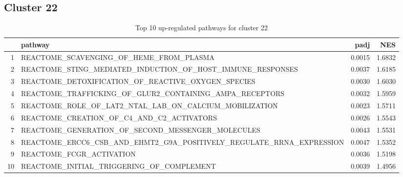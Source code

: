 \documentclass{article}
\begin{document}
\subsection{Cluster 22 }
\begin{table}[H]
\centering
\begin{tabularx}{\textwidth}{rlrr}
  \hline
 & pathway & padj & NES \\ 
  \hline
1 & REACTOME\_SCAVENGING\_OF\_HEME\_FROM\_PLASMA & 0.0015 & 1.6832 \\ 
  2 & REACTOME\_STING\_MEDIATED\_INDUCTION\_OF\_HOST\_IMMUNE\_RESPONSES & 0.0037 & 1.6185 \\ 
  3 & REACTOME\_DETOXIFICATION\_OF\_REACTIVE\_OXYGEN\_SPECIES & 0.0030 & 1.6030 \\ 
  4 & REACTOME\_TRAFFICKING\_OF\_GLUR2\_CONTAINING\_AMPA\_RECEPTORS & 0.0032 & 1.5959 \\ 
  5 & REACTOME\_ROLE\_OF\_LAT2\_NTAL\_LAB\_ON\_CALCIUM\_MOBILIZATION & 0.0023 & 1.5711 \\ 
  6 & REACTOME\_CREATION\_OF\_C4\_AND\_C2\_ACTIVATORS & 0.0026 & 1.5543 \\ 
  7 & REACTOME\_GENERATION\_OF\_SECOND\_MESSENGER\_MOLECULES & 0.0043 & 1.5531 \\ 
  8 & REACTOME\_ERCC6\_CSB\_AND\_EHMT2\_G9A\_POSITIVELY\_REGULATE\_RRNA\_EXPRESSION & 0.0047 & 1.5352 \\ 
  9 & REACTOME\_FCGR\_ACTIVATION & 0.0036 & 1.5198 \\ 
  10 & REACTOME\_INITIAL\_TRIGGERING\_OF\_COMPLEMENT & 0.0039 & 1.4956 \\ 
   \hline
\end{tabularx}
\caption{Top 10 up-regulated pathways for cluster 22} 
\label{tab:q3_2_22}
\end{table}
\end{document}
